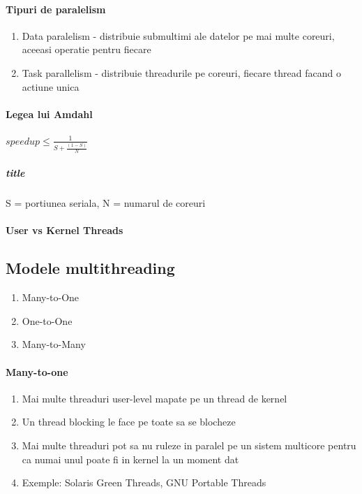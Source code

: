 \documentclass{article}
\begin{document}
\paragraph*{Tipuri de paralelism}
\begin{enumerate}
    \item Data paralelism - distribuie submultimi ale datelor pe mai multe coreuri, aceeasi operatie pentru fiecare
    \item Task parallelism - distribuie threadurile pe coreuri, fiecare thread facand o actiune unica
\end{enumerate}

\paragraph*{Legea lui Amdahl}

\begin{center}
    \begin{math}
        speedup \leq \frac{1}{S+\frac{(1-S)}{N}}
    \end{math}
\end{center}

\subparagraph*{title} S = portiunea seriala, N = numarul de coreuri

\paragraph*{User vs Kernel Threads}

\subsection*{Modele multithreading}
\begin{enumerate}
    \item Many-to-One
    \item One-to-One
    \item Many-to-Many
\end{enumerate}

\paragraph*{Many-to-one}
\begin{enumerate}
    \item Mai multe threaduri user-level mapate pe un thread de kernel
    \item Un thread blocking le face pe toate sa se blocheze
    \item Mai multe threaduri pot sa nu ruleze in paralel pe un sistem multicore pentru ca numai unul poate fi in kernel la un moment dat
    \item Exemple: Solaris Green Threads, GNU Portable Threads
\end{enumerate}
\end{document}
